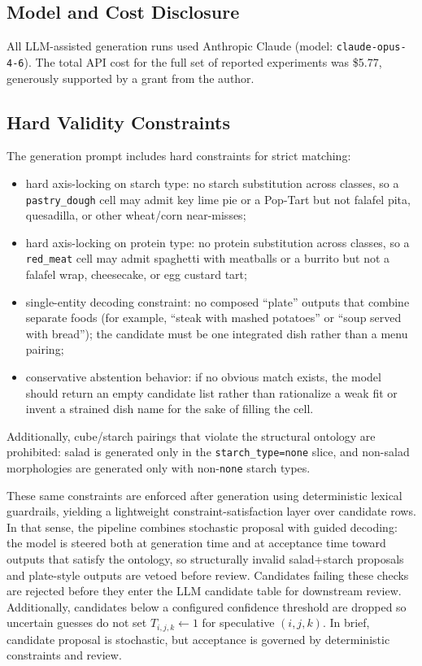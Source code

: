 \subsection{Model and Cost Disclosure}

All LLM-assisted generation runs used Anthropic Claude (model: \texttt{claude-opus-4-6}).
The total API cost for the full set of reported experiments was \$5.77, generously supported by a grant from the author.

\subsection{Hard Validity Constraints}

The generation prompt includes hard constraints for strict matching:
\begin{itemize}
    \item hard axis-locking on starch type: no starch substitution across classes, so a \texttt{pastry\_dough} cell may admit key lime pie or a Pop-Tart but not falafel pita, quesadilla, or other wheat/corn near-misses;
    \item hard axis-locking on protein type: no protein substitution across classes, so a \texttt{red\_meat} cell may admit spaghetti with meatballs or a burrito but not a falafel wrap, cheesecake, or egg custard tart;
    \item single-entity decoding constraint: no composed ``plate'' outputs that combine separate foods (for example, ``steak with mashed potatoes'' or ``soup served with bread''); the candidate must be one integrated dish rather than a menu pairing;
    \item conservative abstention behavior: if no obvious match exists, the model should return an empty candidate list rather than rationalize a weak fit or invent a strained dish name for the sake of filling the cell.
\end{itemize}
Additionally, cube/starch pairings that violate the structural ontology are prohibited: salad is generated only in the \texttt{starch\_type=none} slice, and non-salad morphologies are generated only with non-\texttt{none} starch types.

These same constraints are enforced after generation using deterministic lexical guardrails, yielding a lightweight constraint-satisfaction layer over candidate rows.
In that sense, the pipeline combines stochastic proposal with guided decoding: the model is steered both at generation time and at acceptance time toward outputs that satisfy the ontology, so structurally invalid salad+starch proposals and plate-style outputs are vetoed before review.
Candidates failing these checks are rejected before they enter the LLM candidate table for downstream review.
Additionally, candidates below a configured confidence threshold are dropped so uncertain guesses do not set $T_{i,j,k} \leftarrow 1$ for speculative $(i,j,k)$.
In brief, candidate proposal is stochastic, but acceptance is governed by deterministic constraints and review.

